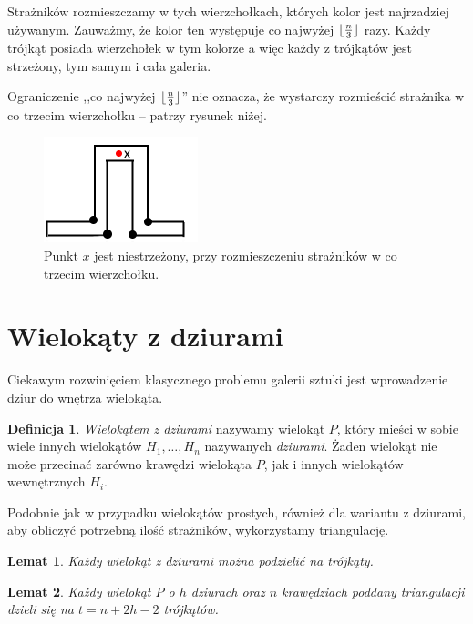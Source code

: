 \documentclass[brudnopis]{xmgr}
\DeclarePairedDelimiter\floor{\lfloor}{\rfloor}
\newtheorem{Lemat}{Lemat}
\theoremstyle{definition}
\newtheorem{Definicja}{Definicja}
\begin{document}
	Strażników rozmieszczamy w tych wierzchołkach, których kolor jest najrzadziej używanym. Zauważmy, że kolor ten występuje co najwyżej $\floor{\frac{n}{3}}$ razy. Każdy trójkąt posiada wierzchołek w tym kolorze a więc każdy z trójkątów jest strzeżony, tym samym i cała galeria.

\indent Ograniczenie ,,co najwyżej $\floor{\frac{n}{3}}$'' nie oznacza, że wystarczy rozmieścić strażnika w co trzecim wierzchołku -- patrzy rysunek niżej.
\begin{figure}[ht!]
  \centering
  \includegraphics{rysunki/co_trzeci.png}
  \caption{Punkt $x$ jest niestrzeżony, przy rozmieszczeniu strażników w co trzecim wierzchołku.}
\end{figure} 

\section{Wielokąty z dziurami}
Ciekawym rozwinięciem klasycznego problemu galerii sztuki jest wprowadzenie dziur do wnętrza wielokąta.

\begin{Definicja} \label{def wielokat z dziurami}
  \emph{Wielokątem z dziurami} nazywamy wielokąt $P$, który mieści w sobie wiele innych wielokątów $H_1, \ldots, H_n$ nazywanych \emph{dziurami}. Żaden wielokąt nie może przecinać zarówno krawędzi wielokąta $P$, jak i innych wielokątów wewnętrznych $H_i$.
\end{Definicja}

\indent Podobnie jak w przypadku wielokątów prostych, również dla wariantu z dziurami, aby obliczyć potrzebną ilość strażników, wykorzystamy triangulację.

\begin{Lemat} \cite{orourke}
  Każdy wielokąt z dziurami można podzielić na trójkąty.
\end{Lemat}

\begin{Lemat}\label{t trójkątów triangulacja} \cite{orourke}
  Każdy wielokąt $P$ o $h$ dziurach oraz $n$ krawędziach poddany triangulacji dzieli się na $t = n + 2h - 2$ trójkątów.
\end{Lemat}
\end{document}
